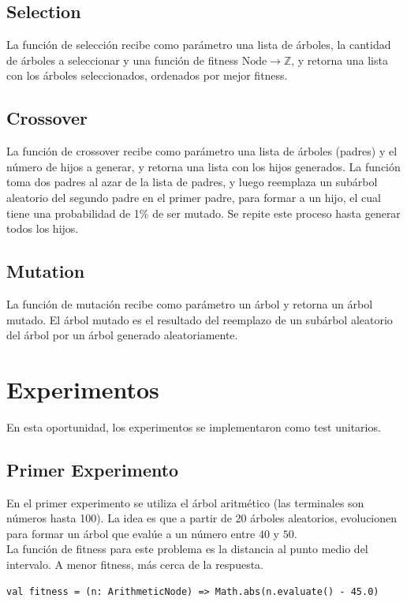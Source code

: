 \documentclass[11pt,letterpaper]{article}
\begin{document}
\subsection{Selection}
La función de selección recibe como parámetro una lista de árboles, la cantidad de árboles a seleccionar y una función de fitness $\text{Node}\rightarrow \mathbb{Z}$, y retorna una lista con los árboles seleccionados, ordenados por mejor fitness.

\subsection{Crossover}
La función de crossover recibe como parámetro una lista de árboles (padres) y el número de hijos a 
generar, y retorna una lista con los hijos generados. La función toma dos padres al azar de la lista de padres, y luego reemplaza un subárbol aleatorio del segundo padre en el primer padre, 
para formar a un hijo, el cual tiene una probabilidad de 1\% de ser mutado. 
Se repite este proceso hasta generar todos los hijos.

\subsection{Mutation}
La función de mutación recibe como parámetro un árbol y retorna un árbol mutado. El árbol mutado es 
el resultado del reemplazo de un subárbol aleatorio del árbol por un árbol generado aleatoriamente.

\section{Experimentos}
En esta oportunidad, los experimentos se implementaron como test unitarios.


\subsection{Primer Experimento}
En el primer experimento se utiliza el árbol aritmético (las terminales son números hasta 100). La idea es que 
a partir de 20 árboles aleatorios, evolucionen para formar un árbol que evalúe a un número entre $40$ y $50$.\\

La función de fitness para este problema es la distancia al punto medio del intervalo. A menor fitness, 
más cerca de la respuesta.
\begin{lstlisting}
val fitness = (n: ArithmeticNode) => Math.abs(n.evaluate() - 45.0)
\end{lstlisting}
\end{document}
